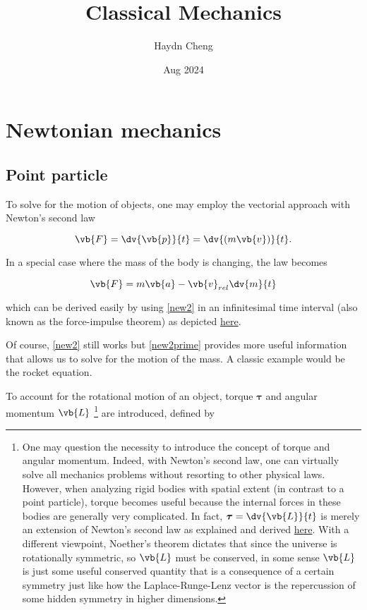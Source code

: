 \documentclass[a4paper,12pt]{report}
\title{Classical Mechanics}
\author{Haydn Cheng}
\date{Aug 2024}
\begin{document}
\maketitle
\tableofcontents
	
\chapter{Newtonian mechanics}
\section{Point particle}

To solve for the motion of objects, one may employ the vectorial approach with Newton's second law

\begin{equation}
	\vb{F} = \dv{\vb{p} }{t} = \dv{(m\vb{v} )}{t}. \label{new2} 
\end{equation}

In a special case where the mass of the body is changing, the law becomes

\begin{equation}
	\vb{F} = m\vb{a} - \vb{v} _{rel} \dv{m}{t} \label{new2prime} 
\end{equation}

which can be derived easily by using \cref{new2} in an infinitesimal time interval (also known as the force-impulse theorem) as depicted \href{https://en.wikipedia.org/wiki/Variable-mass_system}{here}. 

Of course, \cref{new2} still works but \cref{new2prime} provides more useful information that allows us to solve for the motion of the mass. A classic example would be the rocket equation.

To account for the rotational motion of an object, torque \(\boldsymbol{\tau } \) and angular momentum \(\vb{L} \) \footnote{One may question the necessity to introduce the concept of torque and angular momentum. Indeed, with Newton's second law, one can virtually solve all mechanics problems without resorting to other physical laws. However, when analyzing rigid bodies with spatial extent (in contrast to a point particle), torque becomes useful because the internal forces in these bodies are generally very complicated. In fact, \(\boldsymbol{\tau } = \dv{\vb{L} }{t} \) is merely an extension of Newton's second law as explained and derived \href{https://knzhou.github.io/handouts/M2Sol.pdf}{here}. With a different viewpoint, Noether's theorem dictates that since the universe is rotationally symmetric, so \(\vb{L} \) must be conserved, in some sense \(\vb{L}\) is just some useful conserved quantity that is a consequence of a certain symmetry just like how the Laplace-Runge-Lenz vector is the repercussion of some hidden symmetry in higher dimensions.} are introduced, defined by
\end{document}
